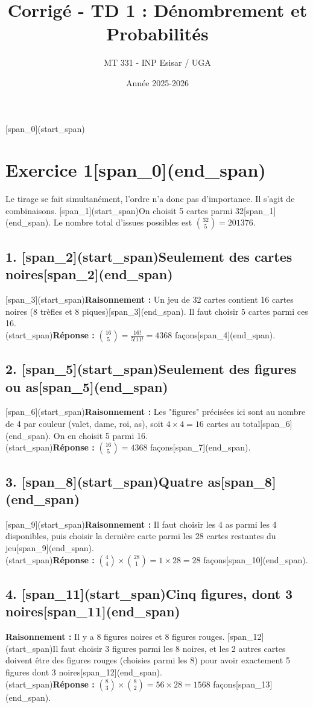 \documentclass[11pt,a4paper]{article}
\title{Corrigé - TD 1 : Dénombrement et Probabilités}
\author{MT 331 - INP Esisar / UGA}
\date{Année 2025-2026}
\begin{document}
\maketitle

[span_0](start_span)\section*{Exercice 1[span_0](end_span)}
Le tirage se fait simultanément, l'ordre n'a donc pas d'importance. Il s'agit de combinaisons. [span_1](start_span)On choisit 5 cartes parmi 32[span_1](end_span). Le nombre total d'issues possibles est $\binom{32}{5} = 201376$.

\subsection*{1. [span_2](start_span)Seulement des cartes noires[span_2](end_span)}
[span_3](start_span)\textbf{Raisonnement :} Un jeu de 32 cartes contient 16 cartes noires (8 trèfles et 8 piques)[span_3](end_span). Il faut choisir 5 cartes parmi ces 16.\\
[span_4](start_span)\textbf{Réponse :} $\binom{16}{5} = \frac{16!}{5!11!} = 4368$ façons[span_4](end_span).

\subsection*{2. [span_5](start_span)Seulement des figures ou as[span_5](end_span)}
[span_6](start_span)\textbf{Raisonnement :} Les "figures" précisées ici sont au nombre de 4 par couleur (valet, dame, roi, as), soit $4 \times 4 = 16$ cartes au total[span_6](end_span). On en choisit 5 parmi 16.\\
[span_7](start_span)\textbf{Réponse :} $\binom{16}{5} = 4368$ façons[span_7](end_span).

\subsection*{3. [span_8](start_span)Quatre as[span_8](end_span)}
[span_9](start_span)\textbf{Raisonnement :} Il faut choisir les 4 as parmi les 4 disponibles, puis choisir la dernière carte parmi les 28 cartes restantes du jeu[span_9](end_span).\\
[span_10](start_span)\textbf{Réponse :} $\binom{4}{4} \times \binom{28}{1} = 1 \times 28 = 28$ façons[span_10](end_span).

\subsection*{4. [span_11](start_span)Cinq figures, dont 3 noires[span_11](end_span)}
\textbf{Raisonnement :} Il y a 8 figures noires et 8 figures rouges. [span_12](start_span)Il faut choisir 3 figures parmi les 8 noires, et les 2 autres cartes doivent être des figures rouges (choisies parmi les 8) pour avoir exactement 5 figures dont 3 noires[span_12](end_span).\\
[span_13](start_span)\textbf{Réponse :} $\binom{8}{3} \times \binom{8}{2} = 56 \times 28 = 1568$ façons[span_13](end_span).
\end{document}
